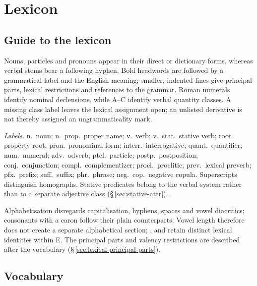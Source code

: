 \chapter{Lexicon}\label{ch:lexicon}

\section{Guide to the lexicon}

Nouns, particles and pronouns appear in their direct or dictionary forms,
whereas verbal stems bear a following hyphen. Bold headwords are followed by
a grammatical label and the English meaning; smaller, indented lines give
principal parts, lexical restrictions and references to the grammar.
Roman numerals identify nominal declensions, while A--C identify verbal
quantity classes. A missing class label leaves the lexical assignment open;
an unlisted derivative is not thereby assigned an ungrammaticality mark.

\noindent\textit{Labels.} n.\ noun; n.\ prop.\ proper name;
v.\ verb; v.\ stat.\ stative verb; root property root;
pron.\ pronominal form; interr.\ interrogative; quant.\ quantifier;
num.\ numeral; adv.\ adverb; ptcl.\ particle; postp.\ postposition;
conj.\ conjunction; compl.\ complementizer; procl.\ proclitic;
prev.\ lexical preverb; pfx.\ prefix; suff.\ suffix; phr.\ phrase;
neg.\ cop.\ negative copula. Superscripts distinguish homographs.
Stative predicates belong to the verbal system rather than to a separate
adjective class (§\,\ref{sec:stative-attr}).

Alphabetisation disregards capitalisation, hyphens, spaces and vowel
diacritics; consonants with a caron follow their plain counterparts.
Vowel length therefore does not create a separate alphabetical section;
,  and  retain distinct lexical identities within E.
The principal parts and valency restrictions are described after the
vocabulary (§\,\ref{sec:lexical-principal-parts}).

\section{Vocabulary}

